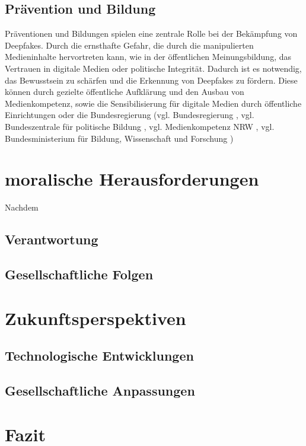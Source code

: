 \documentclass[a4paper,12pt]{article}
\begin{document}
\subsection{Prävention und Bildung}
Präventionen und Bildungen spielen eine zentrale Rolle bei der Bekämpfung von Deepfakes.
Durch die ernsthafte Gefahr, die durch die manipulierten Medieninhalte hervortreten kann,
wie in der öffentlichen Meinungsbildung, das Vertrauen in digitale Medien oder politische Integrität.
Dadurch ist es notwendig, das Bewusstsein zu schärfen und die Erkennung von Deepfakes zu fördern.
Diese können durch gezielte öffentliche Aufklärung und den Ausbau von Medienkompetenz,
sowie die Sensibilisierung für digitale Medien durch öffentliche Einrichtungen oder die Bundesregierung 
(vgl. Bundesregierung \cite{Bundesregierung2024}, vgl. Bundeszentrale für politische Bildung \cite{BPB2024}, vgl. Medienkompetenz NRW \cite{Medienkompetenz2024},
vgl. Bundesministerium für Bildung, Wissenschaft und Forschung \cite{Erwachsenenbildung2024})

\newpage

\section{moralische Herausforderungen}
Nachdem 
\subsection{Verantwortung}
\subsection{Gesellschaftliche Folgen}

\newpage

\section{Zukunftsperspektiven}
\subsection{Technologische Entwicklungen}
\subsection{Gesellschaftliche Anpassungen}
\newpage

\section{Fazit}
\end{document}
